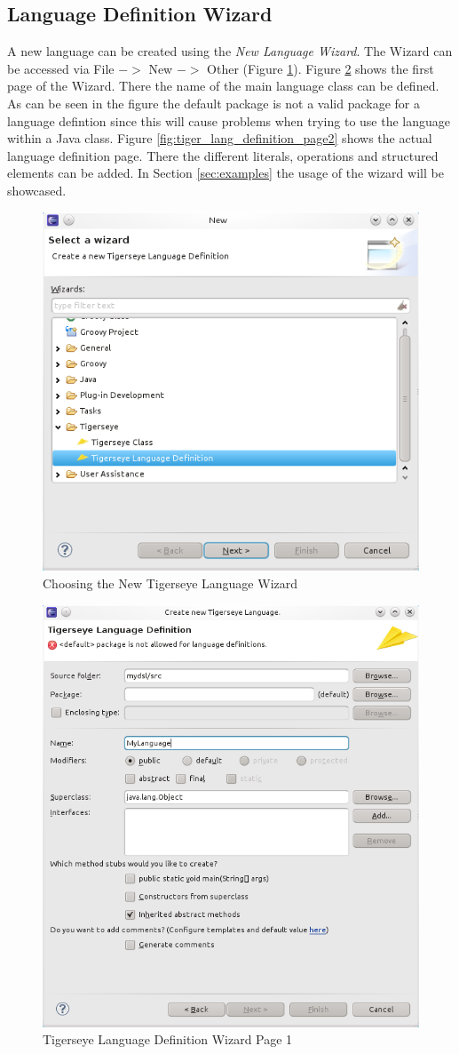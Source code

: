 	\subsection{\tiger Language Definition Wizard}
	  A new language can be created using the \textit{New Language Wizard}. The Wizard can be accessed via File $->$ New $->$ Other (Figure \ref{fig:new_tiger_lang}). Figure \ref{fig:tiger_lang_definition_page1} shows the first page of the Wizard. There the name of the main language class can be defined. As can be seen in the figure the default package is not a valid package for a language defintion since this will cause problems when trying to use the language within a Java class. Figure \ref{fig:tiger_lang_definition_page2} shows the actual language definition page. There the different literals, operations and structured elements can be added. In Section \ref{sec:examples} the usage of the wizard will be showcased.
	
	\begin{figure}
	  \centering
	  \includegraphics[width=.5\textwidth,keepaspectratio=true]{./pics/new_tigesreye_language.png}
	  \caption{Choosing the New Tigerseye Language Wizard}
	  \label{fig:new_tiger_lang}
	\end{figure}

	\begin{figure}
	  \centering
	  \includegraphics[width=.5\textwidth,keepaspectratio=true]{./pics/tigerseye_language_definition_page1.png}
	  \caption{Tigerseye Language Definition Wizard Page 1}
	  \label{fig:tiger_lang_definition_page1}
	\end{figure}
	
